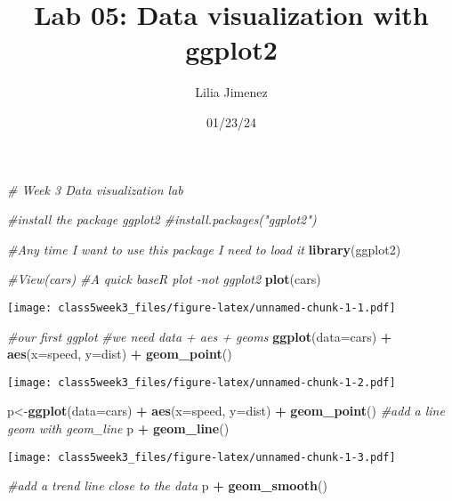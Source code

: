 \documentclass[
]{article}
\title{Lab 05: Data visualization with ggplot2}
\author{Lilia Jimenez}
\date{01/23/24}
\newenvironment{Shaded}{\begin{snugshade}}{\end{snugshade}}
\newcommand{\AttributeTok}[1]{\textcolor[rgb]{0.13,0.29,0.53}{#1}}
\newcommand{\CommentTok}[1]{\textcolor[rgb]{0.56,0.35,0.01}{\textit{#1}}}
\newcommand{\FunctionTok}[1]{\textcolor[rgb]{0.13,0.29,0.53}{\textbf{#1}}}
\newcommand{\NormalTok}[1]{#1}
\newcommand{\OtherTok}[1]{\textcolor[rgb]{0.56,0.35,0.01}{#1}}
\newcommand{\SpecialCharTok}[1]{\textcolor[rgb]{0.81,0.36,0.00}{\textbf{#1}}}
\begin{document}
\maketitle

\begin{Shaded}
\begin{Highlighting}[]
\CommentTok{\# Week 3 Data visualization lab}

\CommentTok{\#install the package ggplot2}
\CommentTok{\#install.packages("ggplot2")}

\CommentTok{\#Any time I want to use this package I need to load it}
\FunctionTok{library}\NormalTok{(ggplot2)}

\CommentTok{\#View(cars)}
\CommentTok{\#A quick baseR plot {-}not ggplot2}
\FunctionTok{plot}\NormalTok{(cars)}
\end{Highlighting}
\end{Shaded}

\texttt{[image: class5week3\_files/figure-latex/unnamed-chunk-1-1.pdf]}

\begin{Shaded}
\begin{Highlighting}[]
\CommentTok{\#our first ggplot}
\CommentTok{\#we need data + aes + geoms}
\FunctionTok{ggplot}\NormalTok{(}\AttributeTok{data=}\NormalTok{cars) }\SpecialCharTok{+} 
  \FunctionTok{aes}\NormalTok{(}\AttributeTok{x=}\NormalTok{speed, }\AttributeTok{y=}\NormalTok{dist) }\SpecialCharTok{+} 
  \FunctionTok{geom\_point}\NormalTok{()}
\end{Highlighting}
\end{Shaded}

\texttt{[image: class5week3\_files/figure-latex/unnamed-chunk-1-2.pdf]}

\begin{Shaded}
\begin{Highlighting}[]
\NormalTok{p}\OtherTok{\textless{}{-}}\FunctionTok{ggplot}\NormalTok{(}\AttributeTok{data=}\NormalTok{cars) }\SpecialCharTok{+} 
  \FunctionTok{aes}\NormalTok{(}\AttributeTok{x=}\NormalTok{speed, }\AttributeTok{y=}\NormalTok{dist) }\SpecialCharTok{+} 
  \FunctionTok{geom\_point}\NormalTok{()}
\CommentTok{\#add a line geom with geom\_line}
\NormalTok{p }\SpecialCharTok{+} \FunctionTok{geom\_line}\NormalTok{()}
\end{Highlighting}
\end{Shaded}

\texttt{[image: class5week3\_files/figure-latex/unnamed-chunk-1-3.pdf]}

\begin{Shaded}
\begin{Highlighting}[]
\CommentTok{\#add a trend line close to the data}
\NormalTok{p }\SpecialCharTok{+} \FunctionTok{geom\_smooth}\NormalTok{()}
\end{Highlighting}
\end{Shaded}
\end{document}
